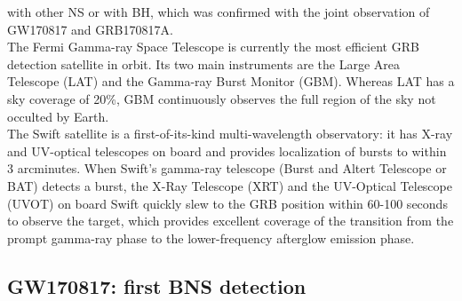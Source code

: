 \documentclass[binding=0.6cm, LaM]{sapthesis}
\begin{document}
	with other NS or with BH, which was confirmed with the joint observation of GW170817 and GRB170817A. \\
	The Fermi Gamma-ray Space Telescope is currently the most efficient GRB detection satellite in orbit. 
	Its two main instruments are the Large Area Telescope (LAT) and the Gamma-ray Burst Monitor (GBM). 
	Whereas LAT has a sky coverage of 20\%, GBM continuously observes the full region of the sky not occulted by Earth. \\ 
	The Swift satellite is a first-of-its-kind multi-wavelength observatory:
	it has X-ray and UV-optical telescopes on board and provides localization of bursts to within 3 arcminutes. 
	When Swift’s gamma-ray telescope (Burst and Altert Telescope or BAT) detects a burst, 
	the X-Ray Telescope (XRT) and the UV-Optical Telescope (UVOT) on board Swift quickly slew to the 
	GRB position within 60-100 seconds to observe the target, which provides excellent coverage 
	of the transition from the prompt gamma-ray phase to the lower-frequency afterglow emission phase.

\subsection{GW170817: first BNS detection}
\end{document}
